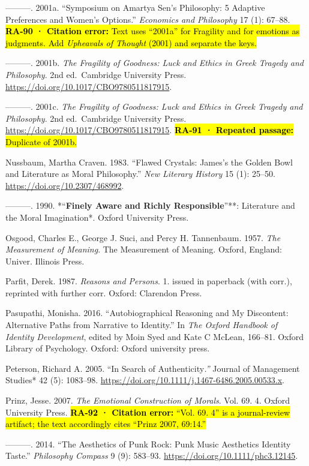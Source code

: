 \documentclass[
  letterpaper,
  DIV=11,
  numbers=noendperiod]{scrartcl}
\theoremstyle{remark}
\begin{document}
---------. 2001a. ``Symposium on Amartya Sen's Philosophy: 5 Adaptive
Preferences and Women's Options.'' \emph{Economics and Philosophy} 17
(1): 67--88. \hl{\textbf{RA-90 · Citation error:} Text uses ``2001a''
for Fragility and for emotions as judgments. Add \emph{Upheavals of
Thought} (2001) and separate the keys.}

---------. 2001b. \emph{The Fragility of Goodness: Luck and Ethics in
Greek Tragedy and Philosophy}. 2nd ed.~Cambridge University Press.
\url{https://doi.org/10.1017/CBO9780511817915}.

---------. 2001c. \emph{The Fragility of Goodness: Luck and Ethics in
Greek Tragedy and Philosophy}. 2nd ed.~Cambridge University Press.
\url{https://doi.org/10.1017/CBO9780511817915}. \hl{\textbf{RA-91 ·
Repeated passage:} Duplicate of 2001b.}

Nussbaum, Martha Craven. 1983. ``Flawed Crystals: James's the Golden
Bowl and Literature as Moral Philosophy.'' \emph{New Literary History}
15 (1): 25--50. \url{https://doi.org/10.2307/468992}.

---------. 1990. *``\textbf{Finely Aware and Richly Responsible}''**:
Literature and the Moral Imagination*. Oxford University Press.

Osgood, Charles E., George J. Suci, and Percy H. Tannenbaum. 1957.
\emph{The Measurement of Meaning}. The Measurement of Meaning. Oxford,
England: Univer. Illinois Press.

Parfit, Derek. 1987. \emph{Reasons and Persons}. 1. issued in paperback
(with corr.), reprinted with further corr. Oxford: Clarendon Press.

Pasupathi, Monisha. 2016. ``Autobiographical Reasoning and My
Discontent: Alternative Paths from Narrative to Identity.'' In \emph{The
Oxford Handbook of Identity Development}, edited by Moin Syed and Kate C
McLean, 166--81. Oxford Library of Psychology. Oxford: Oxford university
press.

Peterson, Richard A. 2005. ``In Search of Authenticity\emph{.'' }Journal
of Management Studies* 42 (5): 1083--98.
\url{https://doi.org/10.1111/j.1467-6486.2005.00533.x}.

Prinz, Jesse. 2007. \emph{The Emotional Construction of Morals}. Vol.
69. 4. Oxford University Press. \hl{\textbf{RA-92 · Citation error:}
``Vol. 69. 4'' is a journal-review artifact; the text accordingly cites
``Prinz 2007, 69:14.''}

---------. 2014. ``The Aesthetics of Punk Rock: Punk Music Aesthetics
Identity Taste.'' \emph{Philosophy Compass} 9 (9): 583--93.
\url{https://doi.org/10.1111/phc3.12145}.
\end{document}
